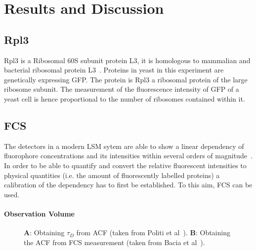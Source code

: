 \section{Results and Discussion}

\subsection{Rpl3}
Rpl3 is a Ribosomal 60S subunit protein L3, it is homologous to mammalian and bacterial ribosomal protein L3~\cite{YeaGenRpl3}.
Proteins in yeast in this experiment are genetically expressing GFP. 
The protein is Rpl3 a ribosomal protein of the large ribosome subunit. 
The measurement of the fluorescence intensity of GFP of a yeast cell is hence proportional to the number of ribosomes contained within it.

\subsection{FCS}
The detectors in a modern LSM sytem are able to show a linear dependency of fluorophore concentrations and its intensities within several orders of magnitude~\cite{Politi2018}. 
In order to be able to quantify and convert the relative fluorescent intensities to physical quantities (i.e. the amount of fluorescently labelled proteins) a calibration of the dependency has to first be established. 
To this aim, FCS can be used.

\paragraph{Observation Volume} 
\begin{figure}[h!]
\centering
{}\hfil
{}
\caption{\textbf{A}: Obtaining $\tau_{D}$ from ACF (taken from Politi et al~\cite{Politi2018}). \textbf{B}: Obtaining the ACF from FCS measurement (taken from Bacia et al~\cite{Bacia2006}).}
\label{fig:acf-fcs}
\end{figure}

